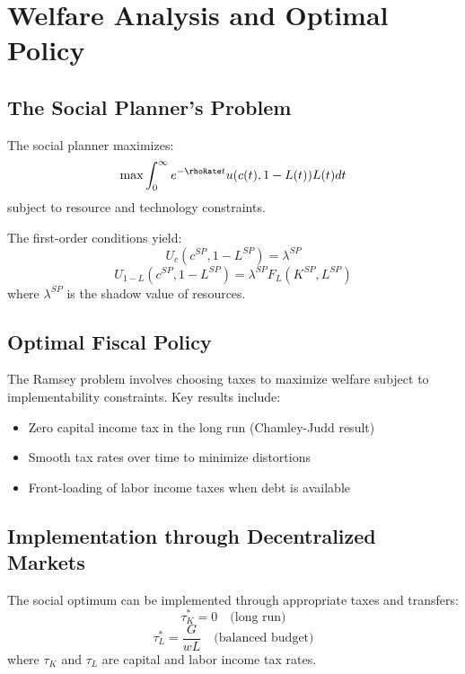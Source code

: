 \documentclass[\topdir/lecture\_notes.tex]{subfiles}
\begin{document}
\section{Welfare Analysis and Optimal Policy}

\subsection{The Social Planner's Problem}

The social planner maximizes:
\begin{equation}
\max \int_0^\infty e^{-\rhoRate t} u(c(t), 1-L(t)) L(t) dt
\end{equation}
subject to resource and technology constraints.

The first-order conditions yield:
\begin{equation}
U_c(c^{SP}, 1-L^{SP}) = \lambda^{SP}
\end{equation}
\begin{equation}
U_{1-L}(c^{SP}, 1-L^{SP}) = \lambda^{SP} F_L(K^{SP}, L^{SP})
\end{equation}
where $\lambda^{SP}$ is the shadow value of resources.

\subsection{Optimal Fiscal Policy}

The Ramsey problem involves choosing taxes to maximize welfare subject to implementability constraints. Key results include:
\begin{itemize}
\item Zero capital income tax in the long run (Chamley-Judd result)
\item Smooth tax rates over time to minimize distortions
\item Front-loading of labor income taxes when debt is available
\end{itemize}

\subsection{Implementation through Decentralized Markets}

The social optimum can be implemented through appropriate taxes and transfers:
\begin{equation}
\tau_K^* = 0 \quad \text{(long run)}
\end{equation}
\begin{equation}
\tau_L^* = \frac{G}{wL} \quad \text{(balanced budget)}
\end{equation}
where $\tau_K$ and $\tau_L$ are capital and labor income tax rates.
\end{document}
